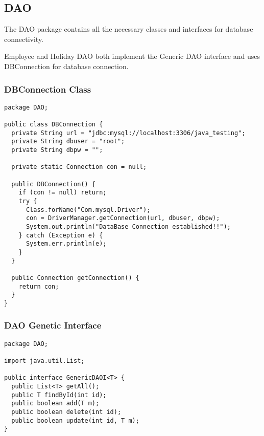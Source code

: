\documentclass[12pt]{article}
\begin{document}
\pagebreak

\subsection{DAO}

The DAO package contains all the necessary classes and interfaces
for database connectivity.

Employee and Holiday DAO both implement the Generic DAO interface
and uses DBConnection for database connection.

\subsubsection{DBConnection Class}
\begin{lstlisting}
package DAO;

public class DBConnection {
  private String url = "jdbc:mysql://localhost:3306/java_testing";
  private String dbuser = "root";
  private String dbpw = "";

  private static Connection con = null;

  public DBConnection() {
    if (con != null) return;
    try {
      Class.forName("Com.mysql.Driver");
      con = DriverManager.getConnection(url, dbuser, dbpw);
      System.out.println("DataBase Connection established!!");
    } catch (Exception e) {
      System.err.println(e);
    }
  }

  public Connection getConnection() {
    return con;
  }
}
\end{lstlisting}

\subsubsection{DAO Genetic Interface}
\begin{lstlisting}
package DAO;

import java.util.List;

public interface GenericDAOI<T> {
  public List<T> getAll();
  public T findById(int id);
  public boolean add(T m);
  public boolean delete(int id);
  public boolean update(int id, T m);
}
\end{lstlisting}

\pagebreak
\end{document}
